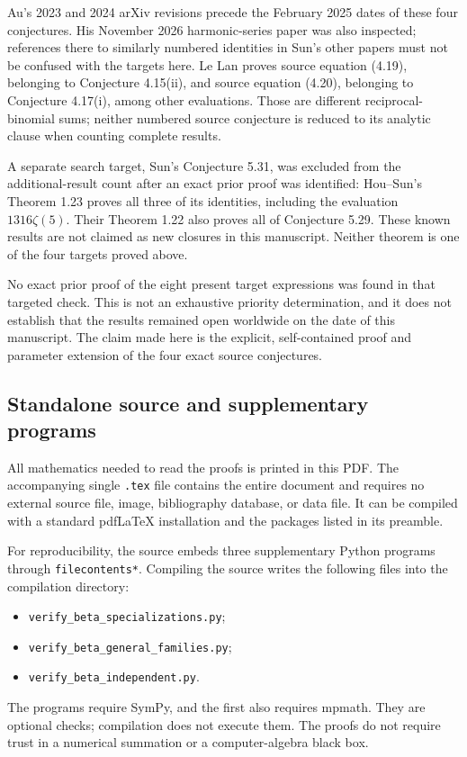 \documentclass[11pt,a4paper]{article}
\theoremstyle{remark}\newtheorem{remark}[theorem]{Remark}
\numberwithin{equation}{section}
\begin{document}
Au's 2023 and 2024 arXiv revisions precede the February 2025 dates of
these four conjectures. His November 2026 harmonic-series paper was
also inspected; references there to similarly numbered identities in
Sun's other papers must not be confused with the targets here.
Le Lan proves source equation (4.19), belonging to Conjecture 4.15(ii),
and source equation (4.20), belonging to Conjecture 4.17(i), among
other evaluations. Those are different reciprocal-binomial sums;
neither numbered source conjecture is reduced to its analytic clause
when counting complete results.

A separate search target, Sun's Conjecture 5.31, was excluded from
the additional-result count after an exact prior proof was identified:
Hou--Sun's Theorem 1.23 proves all three of its identities, including
the evaluation $1316\zeta(5)$. Their Theorem 1.22 also proves all of
Conjecture 5.29. These known results are not claimed as new closures
in this manuscript. Neither theorem is one of the four targets proved
above.

No exact prior proof of the eight present target expressions was found
in that targeted check. This is not an exhaustive priority determination,
and it does not establish that the results remained open worldwide on
the date of this manuscript. The claim made here is the explicit,
self-contained proof and parameter extension of the four exact source
conjectures.

\subsection{Standalone source and supplementary programs}
All mathematics needed to read the proofs is printed in this PDF.
The accompanying single \texttt{.tex} file contains the entire document
and requires no external source file, image, bibliography database,
or data file. It can be compiled with a standard pdfLaTeX installation
and the packages listed in its preamble.

For reproducibility, the source embeds three supplementary Python
programs through \texttt{filecontents*}. Compiling the source writes
the following files into the compilation directory:
\begin{itemize}
\item \texttt{verify\_beta\_specializations.py};
\item \texttt{verify\_beta\_general\_families.py};
\item \texttt{verify\_beta\_independent.py}.
\end{itemize}
The programs require SymPy, and the first also requires mpmath. They
are optional checks; compilation does not execute them. The proofs
do not require trust in a numerical summation or a computer-algebra
black box.
\end{document}
